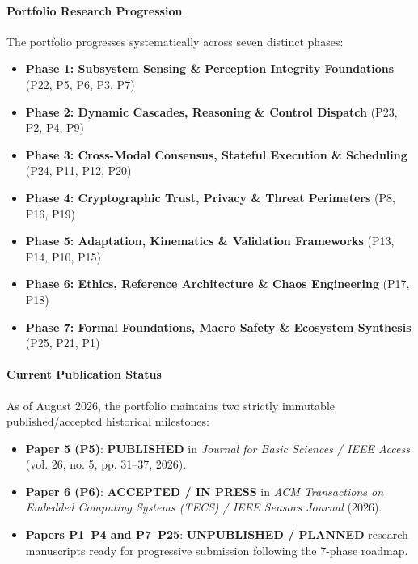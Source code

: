 \documentclass[11pt,letterpaper]{article}
\begin{document}
\paragraph{Portfolio Research Progression}
The portfolio progresses systematically across seven distinct phases:
\begin{itemize}[leftmargin=*]
    \item \textbf{Phase 1: Subsystem Sensing \& Perception Integrity Foundations} (P22, P5, P6, P3, P7)
    \item \textbf{Phase 2: Dynamic Cascades, Reasoning \& Control Dispatch} (P23, P2, P4, P9)
    \item \textbf{Phase 3: Cross-Modal Consensus, Stateful Execution \& Scheduling} (P24, P11, P12, P20)
    \item \textbf{Phase 4: Cryptographic Trust, Privacy \& Threat Perimeters} (P8, P16, P19)
    \item \textbf{Phase 5: Adaptation, Kinematics \& Validation Frameworks} (P13, P14, P10, P15)
    \item \textbf{Phase 6: Ethics, Reference Architecture \& Chaos Engineering} (P17, P18)
    \item \textbf{Phase 7: Formal Foundations, Macro Safety \& Ecosystem Synthesis} (P25, P21, P1)
\end{itemize}

\paragraph{Current Publication Status}
As of August 2026, the portfolio maintains two strictly immutable published/accepted historical milestones:
\begin{itemize}[leftmargin=*]
    \item \textbf{Paper 5 (P5)}: \textbf{PUBLISHED} in \textit{Journal for Basic Sciences / IEEE Access} (vol. 26, no. 5, pp. 31--37, 2026).
    \item \textbf{Paper 6 (P6)}: \textbf{ACCEPTED / IN PRESS} in \textit{ACM Transactions on Embedded Computing Systems (TECS) / IEEE Sensors Journal} (2026).
    \item \textbf{Papers P1--P4 and P7--P25}: \textbf{UNPUBLISHED / PLANNED} research manuscripts ready for progressive submission following the 7-phase roadmap.
\end{itemize}

\end{document}

